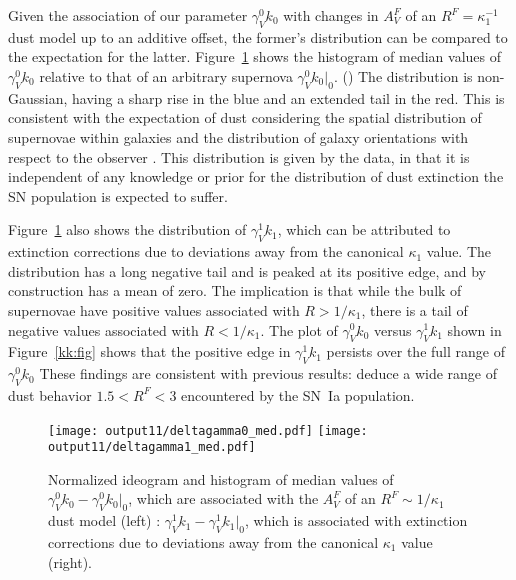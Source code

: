 \documentclass{aastex61}   	%
\begin{document}
Given the association of  our parameter $\gamma^0_V k_0$ with changes in $A^F_V$ of an $R^F =\kappa^{-1}_1$ dust model up to an additive offset,
the former's distribution can be compared to the expectation for the latter.
Figure~\ref{k0_med:fig} shows the histogram of
median values of $\gamma^0_V k_0$ 
\color{purple}
relative to that of an arbitrary supernova  $\gamma^0_V k_0|_0$.
()
\color{black}
The distribution is non-Gaussian, having a sharp rise in the blue and an extended tail in the red.  This is consistent
with the expectation of dust considering the spatial distribution of supernovae within galaxies and the distribution of galaxy orientations with respect to the observer \citep{1998ApJ...502..177H}.  This distribution is given by the data, in that it is independent of any knowledge or prior
for the distribution of dust extinction the SN population is expected to suffer. 

Figure~\ref{k0_med:fig} also shows the distribution of $\gamma^1_V k_1$, which can be attributed to 
extinction corrections due to deviations away from the canonical $\kappa_1$ value.   The distribution has a long
negative tail and is peaked at its positive edge, and by construction has a mean of zero.
The implication is that while the bulk of supernovae have positive values associated with $R>1/\kappa_1$, there is a tail
of negative values associated with $R<1/\kappa_1$.  The plot of   $\gamma^0_V k_0$ versus $\gamma^1_V k_1$  shown in Figure~\ref{kk:fig} shows that
the positive edge in $\gamma^1_V k_1$ persists over the full range of  $\gamma^0_V k_0$
These findings are consistent with previous results:
\citet{2014ApJ...789...32B, 2015MNRAS.453.3300A} deduce a wide range of dust behavior $1.5<R^F<3$ encountered by the SN~Ia population.

\begin{figure}[htbp] %
   \centering
   \texttt{[image: output11/deltagamma0\_med.pdf]}
   \texttt{[image: output11/deltagamma1\_med.pdf]}
      \caption{
      \color{purple} Normalized ideogram and histogram 
      of
median values of $\gamma^0_V k_0-\gamma^0_V k_0|_0$, which are associated with the $A^F_V$ of an $R^F \sim 1/\kappa_1$ dust model
(left) : $\gamma^1_V k_1-\gamma^1_V k_1|_0$,
which  is associated with extinction corrections due to deviations away from the canonical $\kappa_1$ value (right).
      \color{black}
   \label{k0_med:fig}}
\end{figure}
\end{document}
